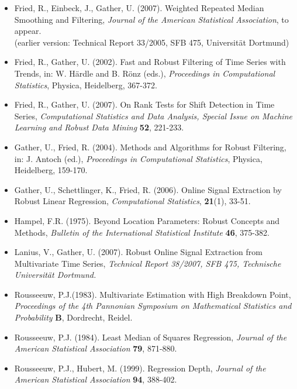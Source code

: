 \documentclass[a4paper]{scrartcl}
\begin{document}
\begin{itemize}
\item
Fried, R., Einbeck, J., Gather, U. (2007). Weighted Repeated Median
Smoothing and Filtering, \emph{Journal of the American Statistical
Association}, to appear.\\
(earlier version:
Technical Report 33/2005, SFB 475, Universit\"{a}t Dortmund)

\item
Fried, R., Gather, U. (2002). Fast and Robust Filtering of Time Series
with Trends, in: W. H\"{a}rdle and B. R\"{o}nz (eds.),
\emph{Proceedings in Computational Statistics}, Physica, Heidelberg, 367-372.

\item
Fried, R., Gather, U. (2007). On Rank Tests for Shift
Detection in Time Series, \emph{Computational Statistics and Data
Analysis, Special Issue on Machine Learning and Robust Data
Mining} \textbf{52}, 221-233.

\item Gather, U., Fried, R. (2004). Methods and Algorithms for Robust
Filtering, in: J. Antoch (ed.), \emph{Proceedings in Computational
Statistics}, Physica, Heidelberg,  159-170.

\item Gather, U., Schettlinger, K., Fried, R. (2006). Online Signal
Extraction by Robust Linear Regression, \emph{Computational
Statistics}, \textbf{21}(1), 33-51.

\item
Hampel, F.R. (1975). Beyond Location Parameters: Robust Concepts
and Methods, \emph{Bulletin of the International Statistical
Institute} \textbf{46}, 375-382.

\item
Lanius, V., Gather, U. (2007). Robust Online Signal Extraction from
Multivariate Time Series, \emph{Technical Report 38/2007, SFB 475,
Technische Universit\"{a}t Dortmund.}

\item
Rousseeuw, P.J.(1983). Multivariate Estimation with High Breakdown
Point, \emph{Proceedings of the 4th Pannonian Symposium on Mathematical
Statistics and Probability} \textbf{B}, Dordrecht, Reidel.

\item Rousseeuw, P.J. (1984). Least Median of Squares Regression,
\emph{Journal of the American Statistical Association} \textbf{79}, 871-880.

\item
Rousseeuw, P.J., Hubert, M. (1999). Regression Depth, \emph{Journal of the
American Statistical Association} \textbf{94}, 388-402.


\end{itemize}
\end{document}
